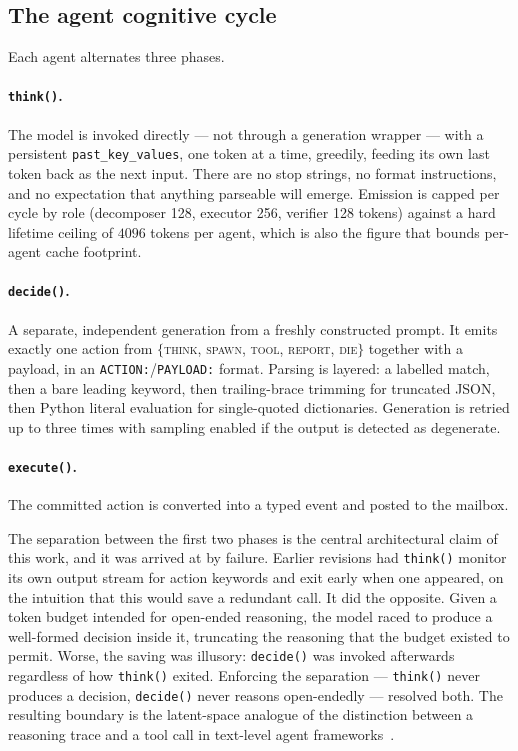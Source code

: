 \documentclass[11pt]{article}
\begin{document}
\subsection{The agent cognitive cycle}
\label{sec:agent}

Each agent alternates three phases.

\paragraph{\texttt{think()}.}
The model is invoked directly --- not through a generation wrapper --- with a
persistent \texttt{past\_key\_values}, one token at a time, greedily, feeding
its own last token back as the next input. There are no stop strings, no format
instructions, and no expectation that anything parseable will emerge. Emission
is capped per cycle by role (decomposer 128, executor 256, verifier 128 tokens)
against a hard lifetime ceiling of $4096$ tokens per agent, which is also the
figure that bounds per-agent cache footprint.

\paragraph{\texttt{decide()}.}
A separate, independent generation from a freshly constructed prompt. It emits
exactly one action from $\{$\textsc{think}, \textsc{spawn}, \textsc{tool},
\textsc{report}, \textsc{die}$\}$ together with a payload, in an
\texttt{ACTION:}/\texttt{PAYLOAD:} format. Parsing is layered: a labelled
match, then a bare leading keyword, then trailing-brace trimming for truncated
JSON, then Python literal evaluation for single-quoted dictionaries. Generation
is retried up to three times with sampling enabled if the output is detected as
degenerate.

\paragraph{\texttt{execute()}.}
The committed action is converted into a typed event and posted to the mailbox.

The separation between the first two phases is the central architectural claim
of this work, and it was arrived at by failure. Earlier revisions had
\texttt{think()} monitor its own output stream for action keywords and exit
early when one appeared, on the intuition that this would save a redundant
call. It did the opposite. Given a token budget intended for open-ended
reasoning, the model raced to produce a well-formed decision inside it,
truncating the reasoning that the budget existed to permit. Worse, the saving
was illusory: \texttt{decide()} was invoked afterwards regardless of how
\texttt{think()} exited. Enforcing the separation --- \texttt{think()} never
produces a decision, \texttt{decide()} never reasons open-endedly --- resolved
both. The resulting boundary is the latent-space analogue of the distinction
between a reasoning trace and a tool call in text-level agent
frameworks~\cite{yao2023react}.
\end{document}
